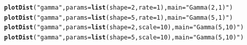 \documentclass[twoside]{book}\usepackage[]{graphicx}\usepackage[]{xcolor}
\makeatletter
\newcommand{\hlnum}[1]{\textcolor[rgb]{0.686,0.059,0.569}{#1}}%
\newcommand{\hlstr}[1]{\textcolor[rgb]{0.192,0.494,0.8}{#1}}%
\newcommand{\hlstd}[1]{\textcolor[rgb]{0.345,0.345,0.345}{#1}}%
\newcommand{\hlkwc}[1]{\textcolor[rgb]{0.333,0.667,0.333}{#1}}%
\newcommand{\hlkwd}[1]{\textcolor[rgb]{0.737,0.353,0.396}{\textbf{#1}}}%
\newenvironment{kframe}{%
 \def\at@end@of@kframe{}%
 \ifinner\ifhmode%
  \def\at@end@of@kframe{\end{minipage}}%
  \begin{minipage}{\columnwidth}%
 \fi\fi%
 \def\FrameCommand##1{\hskip\@totalleftmargin \hskip-\fboxsep
 \colorbox{shadecolor}{##1}\hskip-\fboxsep
     \hskip-\linewidth \hskip-\@totalleftmargin \hskip\columnwidth}%
 \MakeFramed {\advance\hsize-\width
   \@totalleftmargin\z@ \linewidth\hsize
   \@setminipage}}%
 {\par\unskip\endMakeFramed%
 \at@end@of@kframe}
\newenvironment{knitrout}{}{} %
\makeatother
\begin{document}
\begin{knitrout}
\color{fgcolor}\begin{kframe}
\begin{alltt}
\hlkwd{plotDist}\hlstd{(}\hlstr{"gamma"}\hlstd{,} \hlkwc{params} \hlstd{=} \hlkwd{list}\hlstd{(}\hlkwc{shape} \hlstd{=} \hlnum{2}\hlstd{,} \hlkwc{rate} \hlstd{=} \hlnum{1}\hlstd{),} \hlkwc{main} \hlstd{=} \hlstr{"Gamma(2,1)"}\hlstd{)}
\hlkwd{plotDist}\hlstd{(}\hlstr{"gamma"}\hlstd{,} \hlkwc{params} \hlstd{=} \hlkwd{list}\hlstd{(}\hlkwc{shape} \hlstd{=} \hlnum{5}\hlstd{,} \hlkwc{rate} \hlstd{=} \hlnum{1}\hlstd{),} \hlkwc{main} \hlstd{=} \hlstr{"Gamma(5,1)"}\hlstd{)}
\hlkwd{plotDist}\hlstd{(}\hlstr{"gamma"}\hlstd{,} \hlkwc{params} \hlstd{=} \hlkwd{list}\hlstd{(}\hlkwc{shape} \hlstd{=} \hlnum{2}\hlstd{,} \hlkwc{scale} \hlstd{=} \hlnum{10}\hlstd{),} \hlkwc{main} \hlstd{=} \hlstr{"Gamma(5,10)"}\hlstd{)}
\hlkwd{plotDist}\hlstd{(}\hlstr{"gamma"}\hlstd{,} \hlkwc{params} \hlstd{=} \hlkwd{list}\hlstd{(}\hlkwc{shape} \hlstd{=} \hlnum{5}\hlstd{,} \hlkwc{scale} \hlstd{=} \hlnum{10}\hlstd{),} \hlkwc{main} \hlstd{=} \hlstr{"Gamma(5,10)"}\hlstd{)}
\end{alltt}
\end{kframe}


\end{knitrout}
\end{document}
